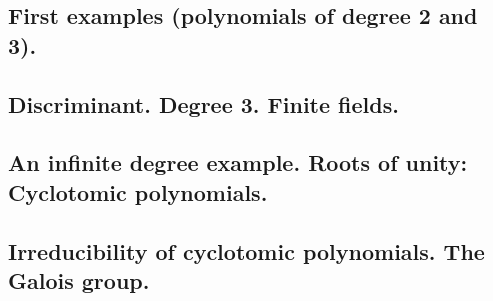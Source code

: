 \subsection{First examples (polynomials of degree 2 and 3).}

\subsection{Discriminant. Degree 3. Finite fields.}

\subsection{An infinite degree example. Roots of unity: Cyclotomic polynomials.}

\subsection{Irreducibility of cyclotomic polynomials. The Galois group.}
